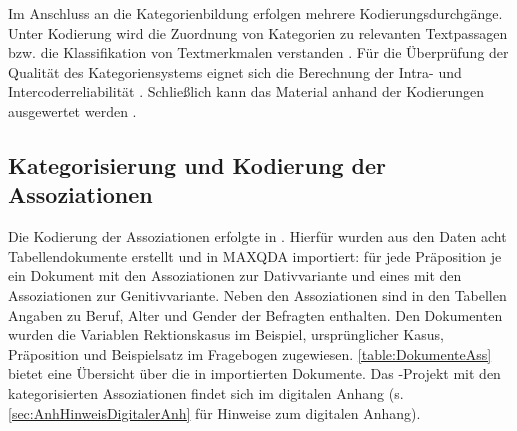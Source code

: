 Im Anschluss an die Kategorienbildung erfolgen mehrere Kodierungsdurchgänge. 
Unter Kodierung wird \glqq die Zuordnung von Kategorien zu relevanten Textpassagen bzw. die Klassifikation von Textmerkmalen verstanden\grqq{} \citep[56]{Kuckartz2010}. 
Für die Überprüfung der Qualität des Kategoriensystems eignet sich die Berechnung der Intra- und Intercoderreliabilität \citep[s.][49--50]{Kuckartz.2014}. Schließlich kann das Material anhand der Kodierungen ausgewertet werden \citep[s.][78]{Kuckartz.2014}. 
\subsection{Kategorisierung und Kodierung der Assoziationen}
\label{sec:KategorisierungAss}
Die Kodierung der Assoziationen erfolgte in \citet{MAXQDA.19892018}. Hierfür wurden aus den Daten acht Tabellendokumente erstellt und in MAXQDA importiert: 
für jede Präposition je ein Dokument mit den Assoziationen zur Dativvariante und eines mit den Assoziationen zur Genitivvariante. 
Neben den Assoziationen sind in den Tabellen Angaben zu Beruf, Alter und Gender der Befragten enthalten. 
Den Dokumenten wurden die Variablen \glqq Rektionskasus im Beispiel\grqq, \glqq ursprünglicher Kasus\grqq, \glqq Präposition\grqq{} und \glqq Beispielsatz im Fragebogen\grqq{} zugewiesen. 
\autoref{table:DokumenteAss} bietet eine Übersicht über die in \citeauthor{MAXQDA.19892018} importierten Dokumente. 
Das \citeauthor{MAXQDA.19892018}-Projekt mit den kategorisierten Assoziationen findet sich im digitalen Anhang (s. \autoref{sec:AnhHinweisDigitalerAnh} für Hinweise zum digitalen Anhang). 

